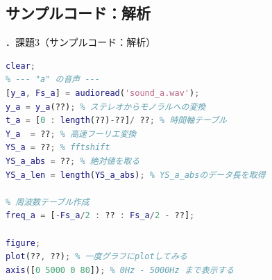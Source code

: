 \documentclass[aspectratio=43]{beamer}
\newcommand{\showsec}{\thesection ．}
\begin{document}
\subsection{サンプルコード：解析}
\begin{frame}[t,containsverbatim]{\showsec 課題3（サンプルコード：解析）}
    \begin{lstlisting}[language=Matlab]
clear;
% --- "a" の音声 ---
[y_a, Fs_a] = audioread('sound_a.wav');
y_a = y_a(??); % ステレオからモノラルへの変換
t_a = [0 : length(??)-??]/ ??; % 時間軸テーブル
Y_a  = ??; % 高速フーリエ変換
YS_a = ??; % fftshift
YS_a_abs = ??; % 絶対値を取る
YS_a_len = length(YS_a_abs); % YS_a_absのデータ長を取得

% 周波数テーブル作成
freq_a = [-Fs_a/2 : ?? : Fs_a/2 - ??];

figure;
plot(??, ??); % 一度グラフにplotしてみる
axis([0 5000 0 80]); % 0Hz - 5000Hz まで表示する
\end{lstlisting}
\end{frame}
\end{document}
